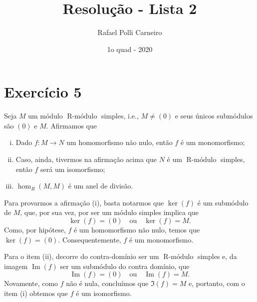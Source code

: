 \documentclass[11pt,twoside,a4paper]{article}
\title{Resolução - Lista 2}
\author{Rafael Polli Carneiro}
\date{1o quad - 2020}
\DeclareMathOperator{\RMod}{ R-\text{módulo}}
\DeclareMathOperator {\Imagem}{ Im }
\theoremstyle{remark}
\theoremstyle{definition}
\theoremstyle{plain}
\begin{document}
\maketitle
\tableofcontents

\section{Exercício 5}
Seja $M$ um módulo $\RMod$ simples, i.e., $M \neq (0)$ e seus únicos submódulos são $(0)$ e $M$.
Afirmamos que
\begin{enumerate}[(i)]
    \item Dado $f: M \to N$ um homomorfismo não nulo, então $f$ é um monomorfismo;
    \item Caso, ainda, tivermos na afirmação acima que $N$ é um $\RMod$ simples, então
          $f$ será um isomorfismo;
    \item $\hom_R(M,M)$ é um anel de divisão.
\end{enumerate}

Para provarmos a afirmação (i), basta notarmos que $\ker(f)$ é um submódulo de $M$, que, por sua vez,
por ser um módulo simples implica que
    \[ \ker(f) = (0) \quad \text{ou} \quad \ker(f) = M.\]
Como, por hipótese, $f$ é um homomorfismo não nulo, temos que $\ker(f) = (0)$. Consequentemente,
$f$ é um monomorfismo.

Para  o item (ii), decorre do contra-domínio ser um $\RMod$ simples e, da imagem $\Imagem(f)$ ser um submódulo
do contra domínio, que
    \[ \Imagem(f) = (0) \quad \text{ou} \quad \Imagem(f) = M.\]
Novamente, como $f$ não é nula, concluímos que $\Im(f) = M$ e, portanto, com o item (i) obtemos que
$f$ é um isomorfismo.
\end{document}
